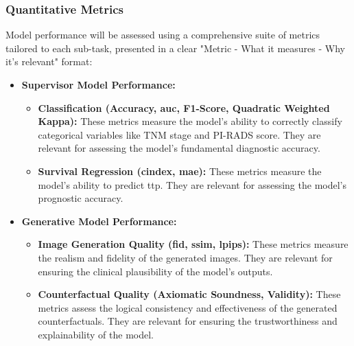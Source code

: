 \documentclass[11pt, a4paper]{article}
\begin{document}
\subsubsection{Quantitative Metrics}
Model performance will be assessed using a comprehensive suite of metrics tailored to each sub-task, presented in a clear "Metric - What it measures - Why it's relevant" format:
\begin{itemize}
    \item \textbf{Supervisor Model Performance:}
        \begin{itemize}
            \item \textbf{Classification (Accuracy, \gls{auc}, F1-Score, Quadratic Weighted Kappa):} These metrics measure the model's ability to correctly classify categorical variables like TNM stage and PI-RADS score. They are relevant for assessing the model's fundamental diagnostic accuracy.
            \item \textbf{Survival Regression (\gls{cindex}, \gls{mae}):} These metrics measure the model's ability to predict \gls{ttp}. They are relevant for assessing the model's prognostic accuracy.
        \end{itemize}
    \item \textbf{Generative Model Performance:}
        \begin{itemize}
            \item \textbf{Image Generation Quality (\gls{fid}, \gls{ssim}, \gls{lpips}):} These metrics measure the realism and fidelity of the generated images. They are relevant for ensuring the clinical plausibility of the model's outputs.
            \item \textbf{Counterfactual Quality (Axiomatic Soundness, Validity):} These metrics assess the logical consistency and effectiveness of the generated counterfactuals. They are relevant for ensuring the trustworthiness and explainability of the model.
        \end{itemize}
\end{itemize}
\end{document}
